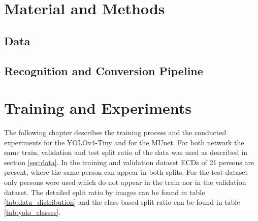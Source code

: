 \chapter{Material and Methods}

\section{Data}


\section{Recognition and Conversion Pipeline}


\chapter{Training and Experiments}

The following chapter describes the training process and the conducted experiments for the \ac{YOLOv4}-Tiny and for the \ac{MUnet}.
For both network the same train, validation and test split ratio of the data was used as described in section \ref{sec:data}.
In the training and validation dataset \acp{ECD} of 21 persons are present, where the same person can appear in both splits.
For the test dataset only persons were used which do not appear in the train nor in the validation dataset.
The detailed split ratio by images can be found in table \ref{tab:data_distribution} and the class based split ratio can be found in table \ref{tab:yolo_classes}.



